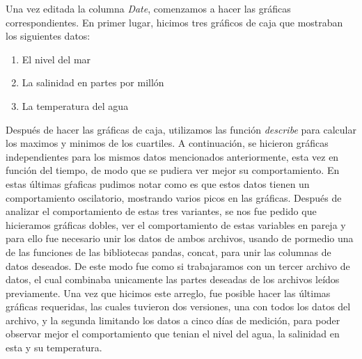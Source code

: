 \documentclass{article}
\begin{document}
Una vez editada la columna \textit{Date}, comenzamos a hacer las gráficas correspondientes. En primer lugar, hicimos tres gráficos de caja que mostraban los siguientes datos: 
\begin{enumerate}
\item El nivel del mar
\item La salinidad en partes por millón
\item La temperatura del agua 
\end{enumerate}
Después de hacer las gráficas de caja, utilizamos las función \textit{describe} para calcular los maximos y minimos de los cuartiles.
A continuación, se hicieron gráficas independientes para los mismos datos mencionados anteriormente, esta vez en función del tiempo, de modo que se pudiera ver mejor su comportamiento. En estas últimas gŕaficas pudimos notar como es que estos datos tienen un comportamiento oscilatorio, mostrando varios picos en las gráficas. 
Después de analizar el comportamiento de estas tres variantes, se nos fue pedido que hicieramos gráficas dobles, ver el comportamiento de estas variables en pareja y para ello fue necesario unir los datos de ambos archivos, usando de pormedio una de las funciones de las bibliotecas pandas, concat, para unir las columnas de datos deseados. De este modo fue como si trabajaramos con un tercer archivo de datos, el cual combinaba unicamente las partes deseadas de los archivos leídos previamente. 
Una vez que hicimos este arreglo, fue posible hacer las últimas gráficas requeridas, las cuales tuvieron dos versiones, una con todos los datos del archivo, y la segunda limitando los datos a cinco días de medición, para poder observar mejor el comportamiento que tenian el nivel del agua, la salinidad en esta y su temperatura. 
\end{document}
